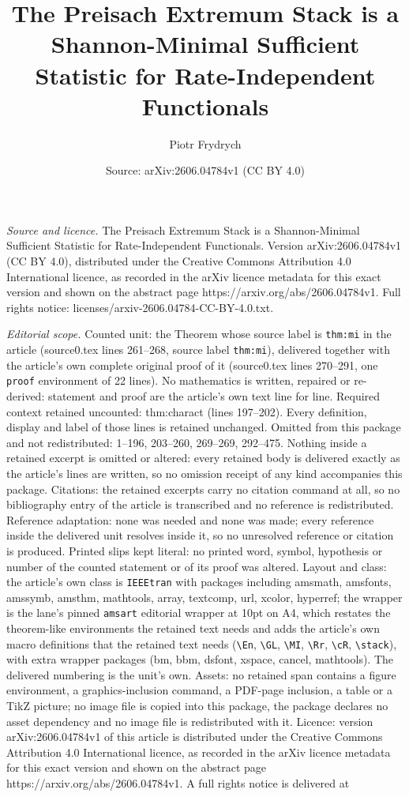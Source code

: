 \documentclass[10pt,a4paper]{amsart}
\title[The Preisach Extremum Stack is a Shannon-Minimal Sufficient ]{The Preisach Extremum Stack is a Shannon-Minimal Sufficient Statistic for Rate-Independent Functionals}
\author{Piotr Frydrych}
\date{Source: arXiv:2606.04784v1 (CC BY 4.0)}
\begin{document}
\maketitle

\noindent\emph{Source and licence.} The Preisach Extremum Stack is a Shannon-Minimal Sufficient Statistic for Rate-Independent Functionals. Version arXiv:2606.04784v1 (CC BY 4.0), distributed under the Creative Commons Attribution 4.0 International licence, as recorded in the arXiv licence metadata for this exact version and shown on the abstract page https://arxiv.org/abs/2606.04784v1. Full rights notice: licenses/arxiv-2606.04784-CC-BY-4.0.txt.\par\smallskip

\noindent\textit{Editorial scope.} Counted unit: the Theorem whose source label is \texttt{thm:mi} in the article (source0.tex lines 261--268, source label \texttt{thm:mi}), delivered together with the article's own complete original proof of it (source0.tex lines 270--291, one \texttt{proof} environment of 22 lines). No mathematics is written, repaired or re-derived: statement and proof are the article's own text line for line. Required context retained uncounted: thm:charact (lines 197--202). Every definition, display and label of those lines is retained unchanged. Omitted from this package and not redistributed: 1--196, 203--260, 269--269, 292--475. Nothing inside a retained excerpt is omitted or altered: every retained body is delivered exactly as the article's lines are written, so no omission receipt of any kind accompanies this package. Citations: the retained excerpts carry no citation command at all, so no bibliography entry of the article is transcribed and no reference is redistributed. Reference adaptation: none was needed and none was made; every reference inside the delivered unit resolves inside it, so no unresolved reference or citation is produced. Printed slips kept literal: no printed word, symbol, hypothesis or number of the counted statement or of its proof was altered. Layout and class: the article's own class is \texttt{IEEEtran} with packages including amsmath, amsfonts, amssymb, amsthm, mathtools, array, textcomp, url, xcolor, hyperref; the wrapper is the lane's pinned \texttt{amsart} editorial wrapper at 10pt on A4, which restates the theorem-like environments the retained text needs and adds the article's own macro definitions that the retained text needs (\texttt{\textbackslash En}, \texttt{\textbackslash GL}, \texttt{\textbackslash MI}, \texttt{\textbackslash Rr}, \texttt{\textbackslash cR}, \texttt{\textbackslash stack}), with extra wrapper packages (bm, bbm, dsfont, xspace, cancel, mathtools). The delivered numbering is the unit's own. Assets: no retained span contains a figure environment, a graphics-inclusion command, a PDF-page inclusion, a table or a TikZ picture; no image file is copied into this package, the package declares no asset dependency and no image file is redistributed with it. Licence: version arXiv:2606.04784v1 of this article is distributed under the Creative Commons Attribution 4.0 International licence, as recorded in the arXiv licence metadata for this exact version and shown on the abstract page https://arxiv.org/abs/2606.04784v1. A full rights notice is delivered at 
\end{document}
